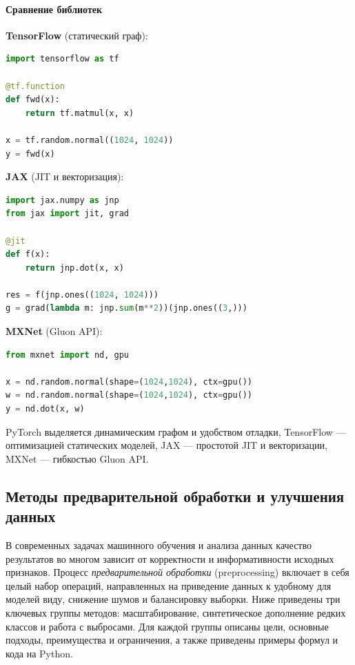 \paragraph{Сравнение библиотек}
\textbf{TensorFlow} (статический граф):
\begin{lstlisting}[language=Python,caption={TensorFlow: определение и запуск функции},label={lst:tf}]
import tensorflow as tf

@tf.function
def fwd(x):
    return tf.matmul(x, x)

x = tf.random.normal((1024, 1024))
y = fwd(x)
\end{lstlisting}

\textbf{JAX} (JIT и векторизация):
\begin{lstlisting}[language=Python,caption={JAX: JIT-компиляция и градиент},label={lst:jax}]
import jax.numpy as jnp
from jax import jit, grad

@jit
def f(x):
    return jnp.dot(x, x)

res = f(jnp.ones((1024, 1024)))
g = grad(lambda m: jnp.sum(m**2))(jnp.ones((3,)))
\end{lstlisting}

\textbf{MXNet} (Gluon API):
\begin{lstlisting}[language=Python,caption={MXNet: dot-операция на GPU},label={lst:mxnet}]
from mxnet import nd, gpu

x = nd.random.normal(shape=(1024,1024), ctx=gpu())
w = nd.random.normal(shape=(1024,1024), ctx=gpu())
y = nd.dot(x, w)
\end{lstlisting}

PyTorch выделяется динамическим графом и удобством отладки, TensorFlow — оптимизацией статических моделей, JAX — простотой JIT и векторизации, MXNet — гибкостью Gluon API.

\subsection{Методы предварительной обработки и улучшения данных}

В современных задачах машинного обучения и анализа данных качество результатов во многом зависит от корректности и информативности исходных признаков. Процесс \emph{предварительной обработки} (preprocessing) включает в себя целый набор операций, направленных на приведение данных к удобному для моделей виду, снижение шумов и балансировку выборки. Ниже приведены три ключевых группы методов: масштабирование, синтетическое дополнение редких классов и работа с выбросами. Для каждой группы описаны цели, основные подходы, преимущества и ограничения, а также приведены примеры формул и кода на Python.

